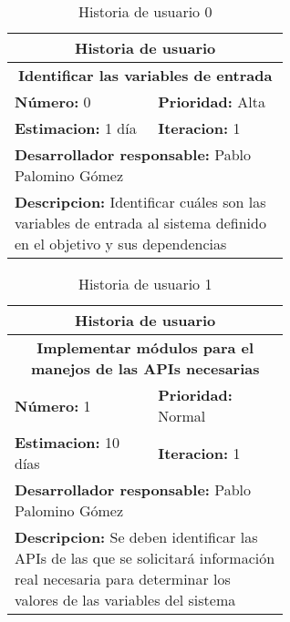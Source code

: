 \begin{table}[H]
        \centering
        \begin{tabular}{|p{0.3\linewidth}|p{0.3\linewidth}|}
          \hline
          \multicolumn{2}{|c|}{Historia de usuario}\\ \hline
          \multicolumn{2}{|c|}{\textbf{Identificar las variables de entrada}}\\ \hline
          \textbf{Número:} 0 & \textbf{Prioridad:} Alta\\ \hline
          \textbf{Estimacion:} 1 día & \textbf{Iteracion:} 1\\ \hline
          \multicolumn{2}{|l|}{\textbf{Desarrollador responsable:} Pablo Palomino Gómez}\\ \hline
          \multicolumn{2}{|p{0.6\linewidth}|}{\textbf{Descripcion:} Identificar cuáles son las variables de entrada al sistema definido en el objetivo y sus dependencias}\\ \hline
        \end{tabular}
        \caption{Historia de usuario 0}
        \label{tab:hist0}
\end{table}
\begin{table}[H]
        \centering
        \begin{tabular}{|p{0.3\linewidth}|p{0.3\linewidth}|}
          \hline
          \multicolumn{2}{|c|}{Historia de usuario}\\ \hline
          \multicolumn{2}{|c|}{\textbf{Implementar módulos para el manejos de las APIs necesarias}}\\ \hline
          \textbf{Número:} 1 & \textbf{Prioridad:} Normal\\ \hline
          \textbf{Estimacion:} 10 días & \textbf{Iteracion:} 1\\ \hline
          \multicolumn{2}{|l|}{\textbf{Desarrollador responsable:} Pablo Palomino Gómez}\\ \hline
          \multicolumn{2}{|p{0.6\linewidth}|}{\textbf{Descripcion:} Se deben identificar las APIs de las que se solicitará información real necesaria para determinar los valores de las variables del sistema}\\ \hline
        \end{tabular}
        \caption{Historia de usuario 1}
        \label{tab:hist1}
\end{table}
